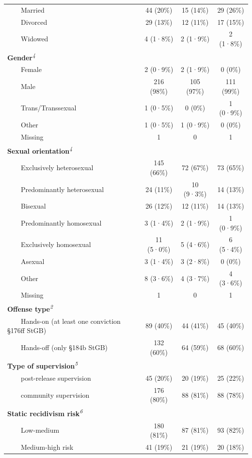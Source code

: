 \documentclass[
  super,
  preprint,
  1p,
  onecolumn]{elsarticle}
\begin{document}
\begin{table}
{\begin{tabular*}{\linewidth}{@{\extracolsep{\fill}}lccc}
    Married & 44 (20\%) & 15 (14\%) & 29 (26\%) \\ 
    Divorced & 29 (13\%) & 12 (11\%) & 17 (15\%) \\ 
    Widowed & 4 (1·8\%) & 2 (1·9\%) & 2 (1·8\%) \\ 
{\bfseries Gender}\textsuperscript{\textit{4}} &  &  &  \\ 
    Female & 2 (0·9\%) & 2 (1·9\%) & 0 (0\%) \\ 
    Male & 216 (98\%) & 105 (97\%) & 111 (99\%) \\ 
    Trans/Transsexual & 1 (0·5\%) & 0 (0\%) & 1 (0·9\%) \\ 
    Other & 1 (0·5\%) & 1 (0·9\%) & 0 (0\%) \\ 
    Missing & 1 & 0 & 1 \\ 
{\bfseries Sexual orientation}\textsuperscript{\textit{4}} &  &  &  \\ 
    Exclusively heterosexual & 145 (66\%) & 72 (67\%) & 73 (65\%) \\ 
    Predominantly heterosexual & 24 (11\%) & 10 (9·3\%) & 14 (13\%) \\ 
    Bisexual & 26 (12\%) & 12 (11\%) & 14 (13\%) \\ 
    Predominantly homosexual & 3 (1·4\%) & 2 (1·9\%) & 1 (0·9\%) \\ 
    Exclusively homosexual & 11 (5·0\%) & 5 (4·6\%) & 6 (5·4\%) \\ 
    Asexual & 3 (1·4\%) & 3 (2·8\%) & 0 (0\%) \\ 
    Other & 8 (3·6\%) & 4 (3·7\%) & 4 (3·6\%) \\ 
    Missing & 1 & 0 & 1 \\ 
{\bfseries Offense type}\textsuperscript{\textit{2}} &  &  &  \\ 
    Hands-on (at least one conviction §176ff StGB) & 89 (40\%) & 44 (41\%) & 45 (40\%) \\ 
    Hands-off (only §184b StGB) & 132 (60\%) & 64 (59\%) & 68 (60\%) \\ 
{\bfseries Type of supervision}\textsuperscript{\textit{5}} &  &  &  \\ 
    post-release supervision & 45 (20\%) & 20 (19\%) & 25 (22\%) \\ 
    community supervision & 176 (80\%) & 88 (81\%) & 88 (78\%) \\ 
{\bfseries Static recidivism risk}\textsuperscript{\textit{6}} &  &  &  \\ 
    Low-medium & 180 (81\%) & 87 (81\%) & 93 (82\%) \\ 
    Medium-high risk & 41 (19\%) & 21 (19\%) & 20 (18\%) \\ 

\end{tabular*}}
\end{table}
\end{document}
